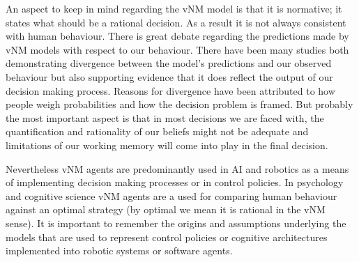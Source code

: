 An aspect to keep in mind regarding the vNM model is that it is normative; it states what should be a rational decision. 
As a result it is not always consistent with human behaviour. There is great debate regarding 
the predictions made by vNM models with respect to our behaviour. There have been many studies both demonstrating divergence 
between the model's predictions and our observed behaviour but also supporting evidence that it does reflect 
the output of our decision making process. Reasons for divergence have been attributed to how people
weigh probabilities and how the decision problem is framed. But probably the most important aspect is that 
in most decisions we are faced with, the quantification and rationality of our beliefs might not be adequate
and limitations of our working memory will come into play in the final decision.

Nevertheless vNM agents are predominantly used in AI and robotics as a means of implementing 
decision making processes or in control policies. In psychology and cognitive science vNM agents
are a used for comparing human behaviour against an optimal strategy (by optimal we mean it is rational in 
the vNM sense). It is important to remember the origins and assumptions underlying the models that 
are used to represent control policies or cognitive architectures implemented into robotic systems or 
software agents.


